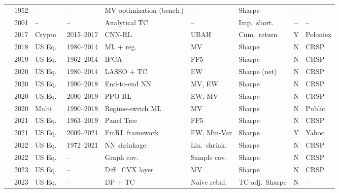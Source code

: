 \begin{longtable}{@{}p{2.4cm} c p{1.0cm} p{1.0cm} p{2.0cm} p{1.9cm} p{1.4cm} c p{1.4cm}@{}}
\citet{Markowitz1952}  & 1952 & --     & --         & MV optimization (bench.) & --        & Sharpe       & -- & --     \\
\citet{Almgren2001}    & 2001 & --     & --         & Analytical TC     & --               & Imp.\ short. & -- & --     \\
\citet{Jiang2017}      & 2017 & Crypto & 2015--2017 & CNN-RL            & UBAH             & Cum.\ return & Y & Poloniex \\
\citet{Ban2018}        & 2018 & US Eq.\ & 1980--2014 & ML + reg.\        & MV             & Sharpe       & N & CRSP   \\
\citet{Kelly2019}      & 2019 & US Eq.\ & 1962--2014 & IPCA              & FF5            & Sharpe       & N & CRSP   \\
\citet{DeMiguel2020}   & 2020 & US Eq.\ & 1980--2014 & LASSO + TC       & EW             & Sharpe (net) & N & CRSP   \\
\citet{Zhang2020}      & 2020 & US Eq.\ & 1990--2018 & End-to-end NN     & MV, EW         & Sharpe       & N & CRSP   \\
\citet{Ye2020}         & 2020 & US Eq.\ & 2000--2019 & PPO RL            & EW, MV         & Sharpe       & N & CRSP   \\
\citet{Nystrup2020}    & 2020 & Multi  & 1990--2018 & Regime-switch ML  & MV             & Sharpe       & N & Public \\
\citet{Cong2021}       & 2021 & US Eq.\ & 1963--2019 & Panel Tree        & FF5            & Sharpe       & N & CRSP   \\
\citet{Wang2021}       & 2021 & US Eq.\ & 2009--2021 & FinRL framework   & EW, Min-Var    & Sharpe       & Y & Yahoo  \\
\citet{Ledoit2022}     & 2022 & US Eq.\ & 1972--2021 & NN shrinkage     & Lin.\ shrink.\ & Sharpe   & N & CRSP   \\
\citet{Zhao2022}       & 2022 & US Eq.\ & --         & Graph cov.        & Sample cov.\   & Sharpe       & N & CRSP   \\
\citet{Butler2023}     & 2023 & US Eq.\ & --         & Diff.\ CVX layer  & MV             & Sharpe       & N & CRSP   \\
\citet{Moallemi2023}   & 2023 & US Eq.\ & --         & DP + TC           & Naive rebal.\  & TC-adj.\ Sharpe & N & --  \\

\end{longtable}

